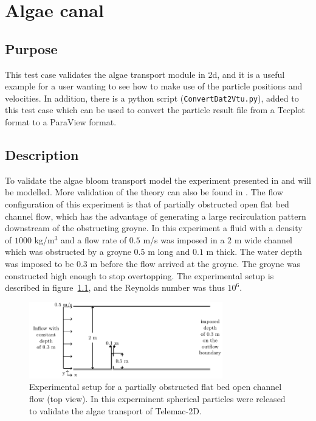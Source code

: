 \chapter{Algae canal}
%


\section{Purpose}

This test case validates the algae transport module in \telemac2d, and it is a useful example for a user
wanting to see how to make use of the particle positions and velocities. In addition, there is a python
script (\texttt{ConvertDat2Vtu.py}), added to this test case which can be used to convert the particle
result file from a Tecplot format to a ParaView format.

\section{Description}

To validate the algae bloom transport model the experiment presented in \citet{Joly2011} and \citet{Joly_jhr}
will be modelled. More validation of the theory can also be found in \citet{Joly_pof}. The flow configuration
of this experiment is that of partially obstructed open flat bed channel flow, which has the advantage of
generating a large recirculation pattern downstream of the obstructing groyne. In this experiment a fluid with
a density of $1000$ kg/m$^{3}$ and a flow rate of $0.5$ m/s was imposed in a $2$ m wide channel which was
obstructed by a groyne $0.5$ m long and $0.1$ m thick. The water depth was imposed to be $0.3$ m before the flow
arrived at the groyne. The groyne was constructed high enough to stop overtopping. The experimental setup is
described in figure~\ref{fig:exp_setup}, and the Reynolds number was thus $10^{6}$.

\begin{figure}[hb]%
\begin{center}
%
  \includegraphics[width=0.75\textwidth]{./Figures/CanalAlgExpSetup}
%
\end{center}
\caption{Experimental setup for a partially obstructed flat bed open channel flow (top view). In this experminent
spherical particles were released to validate the algae transport of Telemac-2D.}
\label{fig:exp_setup}
\end{figure}

